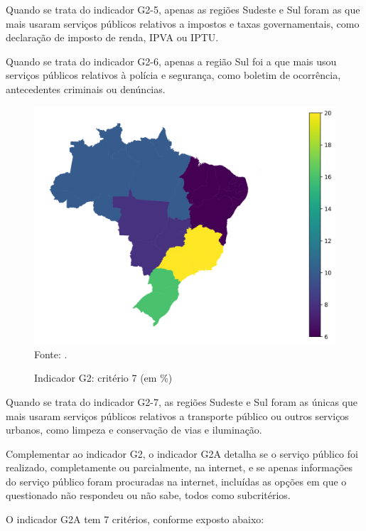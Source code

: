 Quando se trata do indicador G2-5, apenas as regiões Sudeste e Sul foram as que mais usaram serviços públicos relativos a impostos e taxas governamentais, como declaração de imposto de renda, IPVA ou IPTU.

Quando se trata do indicador G2-6, apenas a região Sul foi a que mais usou serviços públicos relativos à polícia e segurança, como boletim de ocorrência, antecedentes criminais ou denúncias.

\begin{figure}[H]
	\centering
	\caption{Indicador G2: critério 7 (em \%)}
	\includegraphics[width=1\linewidth]{figuras/mapa_coropletico_tic_domicilios_2024_g2_7.png}
	\label{fig:mapa_coropletico_tic_domicilios_2024_g2_7}
	\footnotesize{Fonte: \cite{tic_domicilios_2024_g2}.}
\end{figure}

Quando se trata do indicador G2-7, as regiões Sudeste e Sul foram as únicas que mais usaram serviços públicos relativos a transporte público ou outros serviços urbanos, como limpeza e conservação de vias e iluminação.

Complementar ao indicador G2, o indicador G2A detalha se o serviço público foi realizado, completamente ou parcialmente, na internet, e se apenas informações do serviço público foram procuradas na internet, incluídas as opções em que o questionado não respondeu ou não sabe, todos como subcritérios. 

O indicador G2A tem 7 critérios, conforme exposto abaixo:

